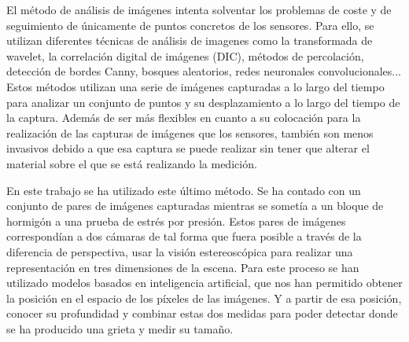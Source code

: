 El método de análisis de imágenes intenta solventar los problemas de coste y de seguimiento de únicamente de puntos concretos de los sensores. Para ello, se utilizan diferentes técnicas de análisis de imagenes \cite{Khan2023Image} como la transformada de wavelet, la correlación digital de imágenes (DIC), métodos de percolación, detección de bordes Canny, bosques aleatorios, redes neuronales convolucionales... Estos métodos utilizan una serie de imágenes capturadas a lo largo del tiempo para analizar un conjunto de puntos y su desplazamiento a lo largo del tiempo de la captura. Además de ser más flexibles en cuanto a su colocación para la realización de las capturas de imágenes que los sensores, también son menos invasivos debido a que esa captura se puede realizar sin tener que alterar el material sobre el que se está realizando la medición.

En este trabajo se ha utilizado este último método. Se ha contado con un conjunto de pares de imágenes capturadas mientras se sometía a un bloque de hormigón a una prueba de estrés por presión. Estos pares de imágenes correspondían a dos cámaras de tal forma que fuera posible a través de la diferencia de perspectiva, usar la visión estereoscópica para realizar una representación en tres dimensiones de la escena. Para este proceso se han utilizado modelos basados en inteligencia artificial, que nos han permitido obtener la posición en el espacio de los píxeles de las imágenes. Y a partir de esa posición, conocer su profundidad y combinar estas dos medidas para poder detectar donde se ha producido una grieta y medir su tamaño.
